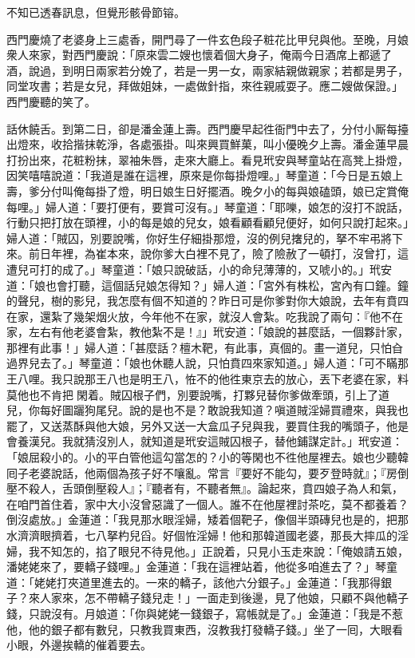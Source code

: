 \begin{myquote}
不知已透春訊息，但覺形骸骨節镕。
\end{myquote}

西門慶燒了老婆身上三處香，開門尋了一件玄色段子粧花比甲兒與他。至晚，月娘衆人來家，對西門慶說：「原來雲二嫂也懷着個大身子，俺兩今日酒席上都遞了酒，說過，到明日兩家若分娩了，若是一男一女，兩家結親做親家；若都是男子，同堂攻書；若是女兒，拜做姐妹，一處做針指，來徃親戚耍子。應二嫂做保證。」西門慶聽的笑了。

話休饒舌。到第二日，卻是潘金蓮上壽。西門慶早起徃衙門中去了，分付小厮每擡出燈來，收拾揩抹乾淨，各處張掛。叫來興買鮮菓，叫小優晚夕上壽。潘金蓮早晨打扮出來，花粧粉抹，翠袖朱唇，走來大廳上。看見玳安與琴童站在高凳上掛燈，因笑嘻嘻說道：「我道是誰在這裡，原來是你每掛燈哩。」琴童道：「今日是五娘上壽，爹分付叫俺每掛了燈，明日娘生日好擺酒。晚夕小的每與娘磕頭，娘已定賞俺每哩。」婦人道：「要打便有，要賞可沒有。」琴童道：「耶嚛，娘怎的沒打不說話，行動只把打放在頭裡，小的每是娘的兒女，娘看顧看顧兒便好，如何只說打起來。」婦人道：「賊囚，別要說嘴，你好生仔細掛那燈，沒的例兒撦兒的，拏不牢弔將下來。前日年裡，為崔本來，說你爹大白裡不見了，險了險赦了一頓打，沒曾打，這遭兒可打的成了。」琴童道：「娘只說破話，小的命兒薄薄的，又唬小的。」{}玳安道：「娘也會打聽，這個話兒娘怎得知？」婦人道：「宮外有株松，宮內有口鐘。鐘的聲兒，樹的影兒，我怎麼有個不知道的？昨日可是你爹對你大娘說，去年有賁四在家，還紮了幾架烟火放，今年他不在家，就沒人會紮。吃我說了兩句：『他不在家，左右有他老婆會紮，教他紮不是！』」{}玳安道：「娘說的甚麼話，一個夥計家，那裡有此事！」婦人道：「甚麼話？檀木靶，有此事，真個的。畫一道兒，只怕㒲過界兒去了。」琴童道：「娘也休聽人說，只怕賁四來家知道。」婦人道：「可不瞞那王八哩。我只說那王八也是明王八，恠不的他徃東京去的放心，丟下老婆在家，料莫他也不肯把𣭈閑着。賊囚根子們，別要說嘴，打夥兒替你爹做牽頭，引上了道兒，你每好圖躧狗尾兒。說的是也不是？敢說我知道？嗔道賊淫婦買禮來，與我也罷了，又送蒸酥與他大娘，另外又送一大盒瓜子兒與我，要買住我的嘴頭子，他是會養漢兒。我就猜沒別人，就知道是玳安這賊囚根子，替他鋪謀定計。」玳安道：「娘屈殺小的。小的平白管他這勾當怎的？小的等閑也不徃他屋裡去。娘也少聽韓囘子老婆說話，他兩個為孩子好不嚷亂。常言『要好不能勾，要歹登時就』；『房倒壓不殺人，舌頭倒壓殺人』；『聽者有，不聽者無』。論起來，賁四娘子為人和氣，在咱門首住着，家中大小沒曾惡識了一個人。誰不在他屋裡討茶吃，莫不都養着？倒沒處放。」金蓮道：「我見那水眼淫婦，矮着個靶子，像個半頭磚兒也是的，把那水濟濟眼擠着，七八拏杓兒舀。好個恠淫婦！他和那韓道國老婆，那長大摔瓜的淫婦，我不知怎的，掐了眼兒不待見他。」{}正說着，只見小玉走來說：「俺娘請五娘，潘姥姥來了，要轎子錢哩。」金蓮道：「我在這裡站着，他從多咱進去了？」琴童道：「姥姥打夾道里進去的。一來的轎子，該他六分銀子。」金蓮道：「我那得銀子？來人家來，怎不帶轎子錢兒走！」一面走到後邊，見了他娘，只顧不與他轎子錢，只說沒有。{}月娘道：「你與姥姥一錢銀子，寫帳就是了。」金蓮道：「我是不惹他，他的銀子都有數兒，只教我買東西，沒教我打發轎子錢。」坐了一囘，大眼看小眼，外邊挨轎的催着要去。

